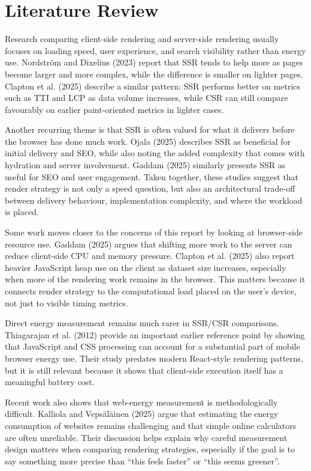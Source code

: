 \section{Literature Review}

Research comparing client-side rendering and server-side rendering usually focuses on loading speed, user experience, and search visibility rather than energy use. Nordström and Dixelius (2023) report that SSR tends to help more as pages become larger and more complex, while the difference is smaller on lighter pages. Clapton et al. (2025) describe a similar pattern: SSR performs better on metrics such as TTI and LCP as data volume increases, while CSR can still compare favourably on earlier paint-oriented metrics in lighter cases.

Another recurring theme is that SSR is often valued for what it delivers before the browser has done much work. Ojala (2025) describes SSR as beneficial for initial delivery and SEO, while also noting the added complexity that comes with hydration and server involvement. Gaddam (2025) similarly presents SSR as useful for SEO and user engagement. Taken together, these studies suggest that render strategy is not only a speed question, but also an architectural trade-off between delivery behaviour, implementation complexity, and where the workload is placed.

Some work moves closer to the concerns of this report by looking at browser-side resource use. Gaddam (2025) argues that shifting more work to the server can reduce client-side CPU and memory pressure. Clapton et al. (2025) also report heavier JavaScript heap use on the client as dataset size increases, especially when more of the rendering work remains in the browser. This matters because it connects render strategy to the computational load placed on the user's device, not just to visible timing metrics.

Direct energy measurement remains much rarer in SSR/CSR comparisons. Thiagarajan et al. (2012) provide an important earlier reference point by showing that JavaScript and CSS processing can account for a substantial part of mobile browser energy use. Their study predates modern React-style rendering patterns, but it is still relevant because it shows that client-side execution itself has a meaningful battery cost.

Recent work also shows that web-energy measurement is methodologically difficult. Kalliola and Vepsäläinen (2025) argue that estimating the energy consumption of websites remains challenging and that simple online calculators are often unreliable. Their discussion helps explain why careful measurement design matters when comparing rendering strategies, especially if the goal is to say something more precise than ``this feels faster'' or ``this seems greener''.

